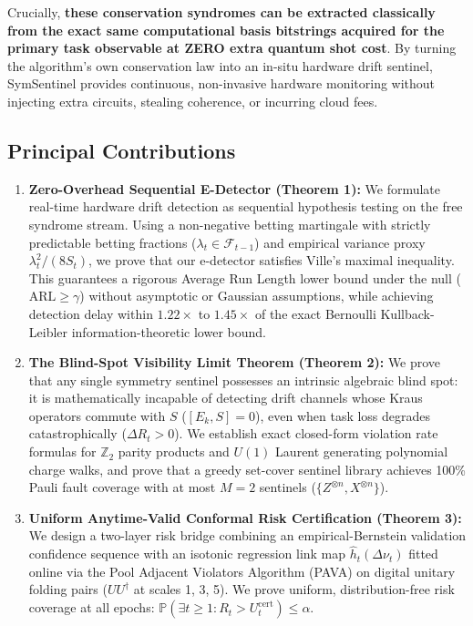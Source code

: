 \documentclass[aps,pra,twocolumn,superscriptaddress,10pt,floatfix]{revtex4-2}
\begin{document}
Crucially, \textbf{these conservation syndromes can be extracted classically from the exact same computational basis bitstrings acquired for the primary task observable at ZERO extra quantum shot cost}. By turning the algorithm's own conservation law into an in-situ hardware drift sentinel, SymSentinel provides continuous, non-invasive hardware monitoring without injecting extra circuits, stealing coherence, or incurring cloud fees.

\subsection{Principal Contributions}
\begin{enumerate}
    \item \textbf{Zero-Overhead Sequential E-Detector (Theorem 1):} We formulate real-time hardware drift detection as sequential hypothesis testing on the free syndrome stream. Using a non-negative betting martingale with strictly predictable betting fractions ($\lambda_t \in \mathcal{F}_{t-1}$) and empirical variance proxy $\lambda_t^2 / (8 S_t)$, we prove that our e-detector satisfies Ville's maximal inequality. This guarantees a rigorous Average Run Length lower bound under the null ($\mathrm{ARL} \ge \gamma$) without asymptotic or Gaussian assumptions, while achieving detection delay within $1.22\times$ to $1.45\times$ of the exact Bernoulli Kullback-Leibler information-theoretic lower bound.
    \item \textbf{The Blind-Spot Visibility Limit Theorem (Theorem 2):} We prove that any single symmetry sentinel possesses an intrinsic algebraic blind spot: it is mathematically incapable of detecting drift channels whose Kraus operators commute with $S$ ($[E_k, S] = 0$), even when task loss degrades catastrophically ($\Delta R_t > 0$). We establish exact closed-form violation rate formulas for $\mathbb{Z}_2$ parity products and $U(1)$ Laurent generating polynomial charge walks, and prove that a greedy set-cover sentinel library achieves 100\% Pauli fault coverage with at most $M = 2$ sentinels ($\{Z^{\otimes n}, X^{\otimes n}\}$).
    \item \textbf{Uniform Anytime-Valid Conformal Risk Certification (Theorem 3):} We design a two-layer risk bridge combining an empirical-Bernstein validation confidence sequence with an isotonic regression link map $\hat{h}_t(\Delta\nu_t)$ fitted online via the Pool Adjacent Violators Algorithm (PAVA) on digital unitary folding pairs ($U U^\dagger$ at scales 1, 3, 5). We prove uniform, distribution-free risk coverage at all epochs: $\mathbb{P}(\exists t \ge 1 : R_t > U_t^{\mathrm{cert}}) \le \alpha$.

\end{enumerate}
\end{document}
